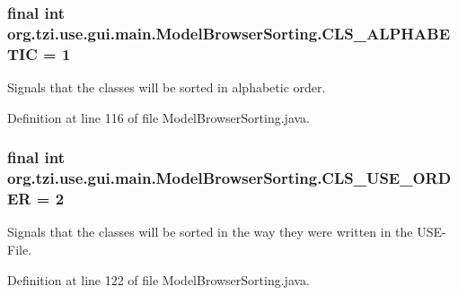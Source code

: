 \hypertarget{classorg_1_1tzi_1_1use_1_1gui_1_1main_1_1_model_browser_sorting_a1fb828ea093401f4927822237dd320d0}{
\subsubsection[{C\-L\-S\-\_\-\-A\-L\-P\-H\-A\-B\-E\-T\-I\-C}]{\setlength{\rightskip}{0pt plus 5cm}final int org.\-tzi.\-use.\-gui.\-main.\-Model\-Browser\-Sorting.\-C\-L\-S\-\_\-\-A\-L\-P\-H\-A\-B\-E\-T\-I\-C = 1\hspace{0.3cm}{\ttfamily [static]}}}\label{classorg_1_1tzi_1_1use_1_1gui_1_1main_1_1_model_browser_sorting_a1fb828ea093401f4927822237dd320d0}
Signals that the classes will be sorted in alphabetic order. 

Definition at line 116 of file Model\-Browser\-Sorting.\-java.

\hypertarget{classorg_1_1tzi_1_1use_1_1gui_1_1main_1_1_model_browser_sorting_a5c54bb4fa4189e2773f7f457d6cf1138}{
\subsubsection[{C\-L\-S\-\_\-\-U\-S\-E\-\_\-\-O\-R\-D\-E\-R}]{\setlength{\rightskip}{0pt plus 5cm}final int org.\-tzi.\-use.\-gui.\-main.\-Model\-Browser\-Sorting.\-C\-L\-S\-\_\-\-U\-S\-E\-\_\-\-O\-R\-D\-E\-R = 2\hspace{0.3cm}{\ttfamily [static]}}}\label{classorg_1_1tzi_1_1use_1_1gui_1_1main_1_1_model_browser_sorting_a5c54bb4fa4189e2773f7f457d6cf1138}
Signals that the classes will be sorted in the way they were written in the U\-S\-E-\/\-File. 

Definition at line 122 of file Model\-Browser\-Sorting.\-java.

